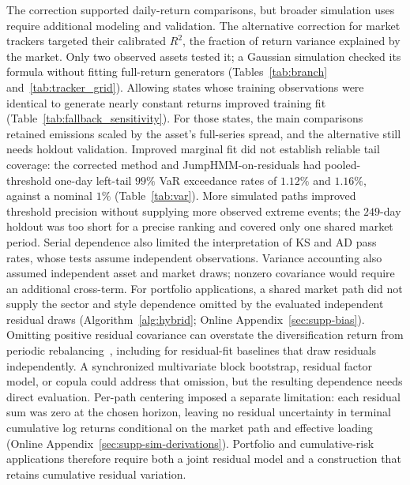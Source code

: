 The correction supported daily-return comparisons, but broader
simulation uses require additional modeling and validation. The alternative
correction for market trackers targeted their calibrated $R^2$, the
fraction of return variance explained by the market. Only two
observed assets tested it; a Gaussian simulation checked its formula
without fitting full-return generators (Tables~\ref{tab:branch}
and~\ref{tab:tracker_grid}). Allowing states whose training observations were identical to
generate nearly constant returns improved training fit (Table~\ref{tab:fallback_sensitivity}). For those states, the main comparisons retained emissions scaled
by the asset's full-series spread, and the alternative still needs holdout validation. Improved
marginal fit did not establish reliable tail coverage: the corrected
method and JumpHMM-on-residuals had pooled-threshold one-day left-tail
$99\%$ VaR exceedance rates of $1.12\%$ and $1.16\%$, against a
nominal $1\%$ (Table~\ref{tab:var}). More simulated paths improved
threshold precision without supplying more observed extreme events;
the $249$-day holdout was too short for a precise ranking and covered
only one shared market period. Serial dependence also limited the
interpretation of KS and AD pass rates, whose tests assume independent
observations. Variance accounting also assumed independent asset and market
draws; nonzero covariance would require an additional cross-term.
For portfolio applications,
a shared market path did not supply the sector and style dependence
omitted by the evaluated independent residual draws
(Algorithm~\ref{alg:hybrid}; Online Appendix~\ref{sec:supp-bias}).
Omitting positive residual covariance can overstate the
diversification return from periodic rebalancing~\cite{boothFama1992,
boucheyNemtchinovWong2015, markowitz1976longRun}, including for
residual-fit baselines that draw residuals independently. A
synchronized multivariate block bootstrap, residual factor model, or
copula could address that omission, but the resulting dependence
needs direct evaluation. Per-path centering imposed a separate
limitation: each residual sum was zero at the chosen horizon, leaving
no residual uncertainty in terminal cumulative log returns conditional on
the market path and effective loading (Online
Appendix~\ref{sec:supp-sim-derivations}). Portfolio and cumulative-risk
applications therefore require both a joint residual model and a
construction that retains cumulative residual variation.
